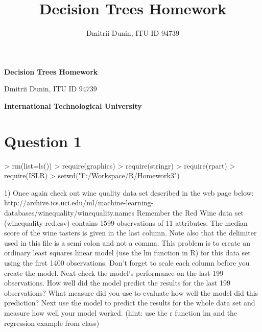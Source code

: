 \documentclass{article}
\title{Decision Trees Homework}
\author{Dmitrii Dunin, ITU ID 94739}
\begin{document}

\begin{center}
{\bf\Large Decision Trees Homework}
\end{center}
\begin{center}
{\Large Dmitrii Dunin, ITU ID 94739}
\end{center}
\begin{center}
{\bf\Large International Technological University}
\end{center}

\section*{Question 1}

\begin{Schunk}
\begin{Sinput}
> rm(list=ls())
> require(graphics)
> require(stringr)
> require(rpart)
> require(ISLR)
> setwd("F:/Workspace/R/Homework3")
\end{Sinput}
\end{Schunk}

1) Once again check out wine quality data set described in the web page
below:
http://archive.ics.uci.edu/ml/machine-learning-databases/winequality/winequality.names
Remember the Red Wine data set (winequality-red.csv) contains 1599
observations of 11 attributes. The median score of the wine tasters is given in
the last column. Note also that the delimiter used in this file is a semi colon
and not a comma. This problem is to create an ordinary least squares linear
model (use the lm function in R) for this data set using the first 1400
observations. Don't forget to scale each column before you create the model.
Next check the model's performance on the last 199 observations. How well
did the model predict the results for the last 199 observations? What measure
did you use to evaluate how well the model did this prediction? Next use the
model to predict the results for the whole data set and measure how well your
model worked. (hint: use the r function lm and the regression example from
class)
\end{document}
